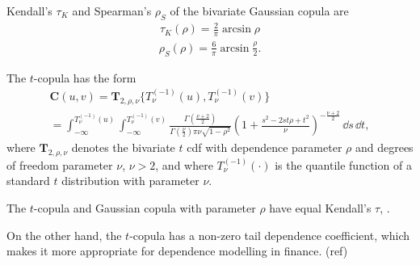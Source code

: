 
Kendall's $\tau_K$ and Spearman's $\rho_S$ of the bivariate Gaussian copula are
    \begin{align*}
        \tau_K(\rho) = \frac{2}{\pi}\arcsin\rho
        \end{align*}
    \begin{align*}
        \rho_S(\rho) = \frac{6}{\pi}\arcsin\frac{\rho}{2}.
        \end{align*}

The $t$-copula has the form
\begin{multline*}
        \bm{C}(u,v) = \bm{T}_{2, \rho, \nu}\{T^{(-1)}_\nu(u), T^{(-1)}_\nu(v)\}\\
        = \int_{-\infty}^{T^{(-1)}_\nu(u)}
               \int_{-\infty}^{T^{(-1)}_\nu(v)}
            \frac{\Gamma\left(\frac{\nu+2}{2}\right)}
            {\Gamma\left(\frac{\nu}{2}\right)\pi\nu\sqrt{1-\rho^2}}
             \left(
        1+\frac{s^2-2st\rho+t^2}{\nu}
        \right)^{-\frac{\nu+2}{2}}\, \dd s\, \dd t,
    \end{multline*}
where $\bm{T}_{2, \rho, \nu}$ denotes the 
bivariate $t$ cdf with dependence parameter $\rho$ and degrees of
freedom parameter $\nu$, $\nu>2$,
and where $T^{(-1)}_\nu(\cdot)$ is the quantile function of a standard
$t$ distribution with parameter $\nu$. 

The $t$-copula and Gaussian copula with parameter $\rho$ have equal Kendall's $\tau$, \citep[see][and references therein]{demarta2005t}.

On the other hand, the $t$-copula has a non-zero tail dependence coefficient,
 which makes it more appropriate for dependence modelling in finance. (ref)

